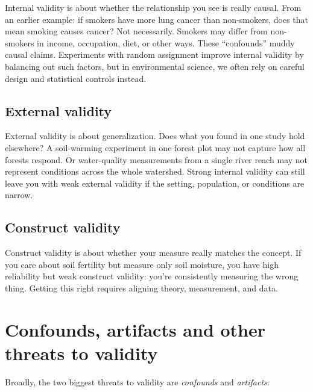 \documentclass[
  letterpaper,
  DIV=11,
  numbers=noendperiod]{scrreprt}
\begin{document}
Internal validity is about whether the relationship you see is really
causal. From an earlier example: if smokers have more lung cancer than
non-smokers, does that mean smoking causes cancer? Not necessarily.
Smokers may differ from non-smokers in income, occupation, diet, or
other ways. These ``confounds'' muddy causal claims. Experiments with
random assignment improve internal validity by balancing out such
factors, but in environmental science, we often rely on careful design
and statistical controls instead.

\subsection{External validity}\label{external-validity}

External validity is about generalization. Does what you found in one
study hold elsewhere? A soil-warming experiment in one forest plot may
not capture how all forests respond. Or water-quality measurements from
a single river reach may not represent conditions across the whole
watershed. Strong internal validity can still leave you with weak
external validity if the setting, population, or conditions are narrow.

\subsection{Construct validity}\label{construct-validity}

Construct validity is about whether your measure really matches the
concept. If you care about soil fertility but measure only soil
moisture, you have high reliability but weak construct validity: you're
consistently measuring the wrong thing. Getting this right requires
aligning theory, measurement, and data.

\section{Confounds, artifacts and other threats to
validity}\label{confounds-artifacts-and-other-threats-to-validity}

Broadly, the two biggest threats to validity are \emph{confounds} and
\emph{artifacts}:
\end{document}
